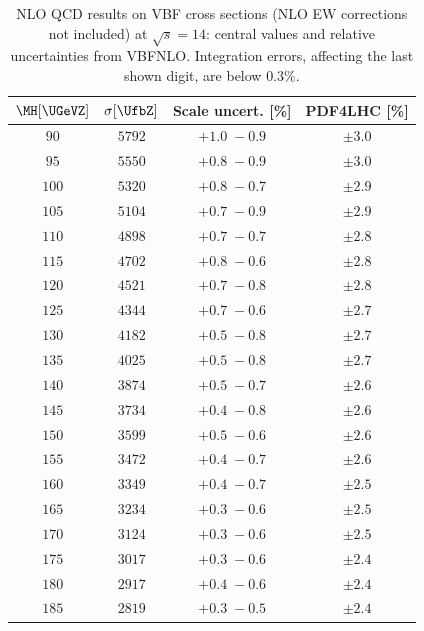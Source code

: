 \begin{table}
  \caption{NLO QCD results on VBF cross sections (NLO EW corrections not included) at $\sqrt{s} = 14$\UTeV: central values 
  and relative uncertainties  from {\sc VBFNLO}. Integration errors, affecting 
  the last shown digit, are below $0.3\%$.
  }
  \centering
  \small
  \begin{tabular}{cccc}\hline
$\MH [\UGeVZ]$ & $\sigma[\UfbZ]$ & Scale uncert. [\%] & PDF4LHC [\%] \\
  \hline
$90  $&$ 5792   $&$ +1.0  \; -\!0.9  $&$ \pm 3.0 $ \\
$95  $&$ 5550   $&$ +0.8  \; -\!0.9  $&$ \pm 3.0 $ \\
$100 $&$ 5320   $&$ +0.8  \; -\!0.7  $&$ \pm 2.9 $ \\
$105 $&$ 5104   $&$ +0.7  \; -\!0.9  $&$ \pm 2.9 $ \\
$110 $&$ 4898   $&$ +0.7  \; -\!0.7  $&$ \pm 2.8 $ \\
$115 $&$ 4702   $&$ +0.8  \; -\!0.6  $&$ \pm 2.8 $ \\
$120 $&$ 4521   $&$ +0.7  \; -\!0.8  $&$ \pm 2.8 $ \\
$125 $&$ 4344   $&$ +0.7  \; -\!0.6  $&$ \pm 2.7 $ \\
$130 $&$ 4182   $&$ +0.5  \; -\!0.8  $&$ \pm 2.7 $ \\
$135 $&$ 4025   $&$ +0.5  \; -\!0.8  $&$ \pm 2.7 $ \\
$140 $&$ 3874   $&$ +0.5  \; -\!0.7  $&$ \pm 2.6 $ \\
$145 $&$ 3734   $&$ +0.4  \; -\!0.8  $&$ \pm 2.6 $ \\
$150 $&$ 3599   $&$ +0.5  \; -\!0.6  $&$ \pm 2.6 $ \\
$155 $&$ 3472   $&$ +0.4  \; -\!0.7  $&$ \pm 2.6 $ \\
$160 $&$ 3349   $&$ +0.4  \; -\!0.7  $&$ \pm 2.5 $ \\
$165 $&$ 3234   $&$ +0.3  \; -\!0.6  $&$ \pm 2.5 $ \\
$170 $&$ 3124   $&$ +0.3  \; -\!0.6  $&$ \pm 2.5 $ \\
$175 $&$ 3017   $&$ +0.3  \; -\!0.6  $&$ \pm 2.4 $ \\
$180 $&$ 2917   $&$ +0.4  \; -\!0.6  $&$ \pm 2.4 $ \\
$185 $&$ 2819   $&$ +0.3  \; -\!0.5  $&$ \pm 2.4 $ \\

\end{tabular}
\end{table}
